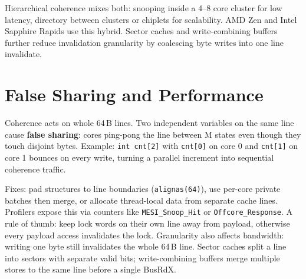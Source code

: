 \begin{center}
\end{center}

Hierarchical coherence mixes both: snooping inside a 4--8 core cluster for low latency, directory between clusters or chiplets for scalability. AMD Zen and Intel Sapphire Rapids use this hybrid. Sector caches and write-combining buffers further reduce invalidation granularity by coalescing byte writes into one line invalidate.

\section{False Sharing and Performance}\label{sec:false-sharing}
Coherence acts on whole 64\,B lines. Two independent variables on the same line cause \textbf{false sharing}: cores ping-pong the line between M states even though they touch disjoint bytes. Example: \texttt{int cnt[2]} with \texttt{cnt[0]} on core 0 and \texttt{cnt[1]} on core 1 bounces on every write, turning a parallel increment into sequential coherence traffic.

Fixes: pad structures to line boundaries (\texttt{alignas(64)}), use per-core private batches then merge, or allocate thread-local data from separate cache lines. Profilers expose this via counters like \texttt{MESI\_Snoop\_Hit} or \texttt{Offcore\_Response}. A rule of thumb: keep lock words on their own line away from payload, otherwise every payload access invalidates the lock. Granularity also affects bandwidth: writing one byte still invalidates the whole 64\,B line. Sector caches split a line into sectors with separate valid bits; write-combining buffers merge multiple stores to the same line before a single BusRdX.

